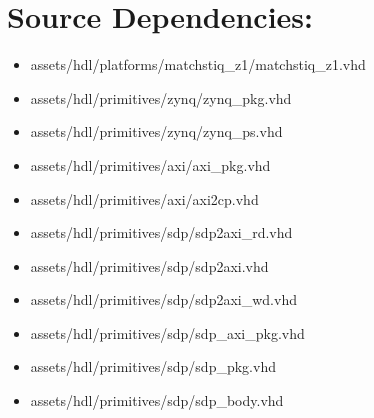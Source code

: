 \documentclass{article}
\begin{document}
\newpage
\section*{Source Dependencies:}
\begin{itemize}
	\item
assets/hdl/platforms/matchstiq\_z1/matchstiq\_z1.vhd
	\item
assets/hdl/primitives/zynq/zynq\_pkg.vhd
	\item
assets/hdl/primitives/zynq/zynq\_ps.vhd
	\item
assets/hdl/primitives/axi/axi\_pkg.vhd
	\item
assets/hdl/primitives/axi/axi2cp.vhd
	\item
assets/hdl/primitives/sdp/sdp2axi\_rd.vhd
	\item
assets/hdl/primitives/sdp/sdp2axi.vhd
	\item
assets/hdl/primitives/sdp/sdp2axi\_wd.vhd
	\item
assets/hdl/primitives/sdp/sdp\_axi\_pkg.vhd
	\item
assets/hdl/primitives/sdp/sdp\_pkg.vhd
	\item
assets/hdl/primitives/sdp/sdp\_body.vhd
\end{itemize}
\end{document}

